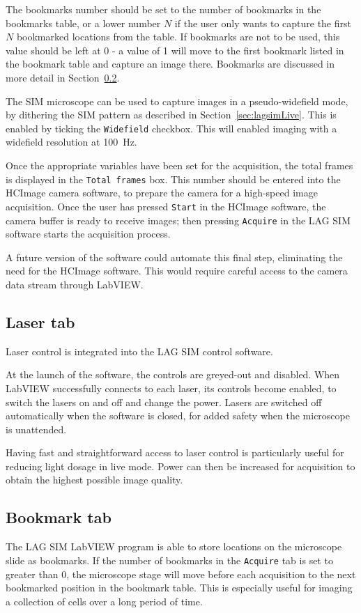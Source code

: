 The bookmarks number should be set to the number of bookmarks in the bookmarks table, or a lower number $N$ if the user only wants to capture the first $N$ bookmarked locations from the table. 
If bookmarks are not to be used, this value should be left at 0 - a value of 1 will move to the first bookmark listed in the bookmark table and capture an image there. 
Bookmarks are discussed in more detail in Section~\ref{sec:lagsimBookmarks}. 

The SIM microscope can be used to capture images in a pseudo-widefield mode, by dithering the SIM pattern as described in Section~\ref{sec:lagsimLive}. 
This is enabled by ticking the \texttt{Widefield} checkbox. 
This will enabled imaging with a widefield resolution at \SI{100}{\hertz}. 

Once the appropriate variables have been set for the acquisition, the total frames is displayed in the \texttt{Total frames} box. 
This number should be entered into the HCImage camera software, to prepare the camera for a high-speed image acquisition. 
Once the user has pressed \texttt{Start} in the HCImage software, the camera buffer is ready to receive images; then pressing \texttt{Acquire} in the LAG SIM software starts the acquisition process. 

A future version of the software could automate this final step, eliminating the need for the HCImage software.
This would require careful access to the camera data stream through LabVIEW. 


\subsection{Laser tab}
Laser control is integrated into the LAG SIM control software. 

At the launch of the software, the controls are greyed-out and disabled. 
When LabVIEW successfully connects to each laser, its controls become enabled, to switch the lasers on and off and change the power. 
Lasers are switched off automatically when the software is closed, for added safety when the microscope is unattended. 

Having fast and straightforward access to laser control is particularly useful for reducing light dosage in live mode.
Power can then be increased for acquisition to obtain the highest possible image quality. 

\subsection{Bookmark tab} \label{sec:lagsimBookmarks}
The LAG SIM LabVIEW program is able to store locations on the microscope slide as bookmarks.
If the number of bookmarks in the \texttt{Acquire} tab is set to greater than 0, the microscope stage will move before each acquisition to the next bookmarked position in the bookmark table. 
This is especially useful for imaging a collection of cells over a long period of time. 

